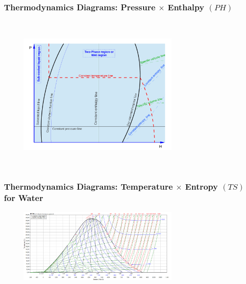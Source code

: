 \documentclass[10pt,compress,handout,ignorenonframetext]{beamer}
\begin{document}
\begin{frame}
 \frametitle{Thermodynamics Diagrams: Pressure $\times$ Enthalpy $(PH)$}
  \begin{center}
   \begin{figure} 
      \includegraphics[width=8cm,height=7.9cm,clip]{./Pics/Overview_Refrig17}
   \end{figure}
   \end{center}
\end{frame}

\begin{frame}
 \frametitle{Thermodynamics Diagrams: Temperature $\times$ Entropy $(TS)$ for Water}
  \begin{center}
   \begin{figure}
     \includegraphics[width=8cm,height=7.cm,clip]{./Pics/water_TS.png}
   \end{figure}
   \end{center}
\end{frame}
\end{document}
